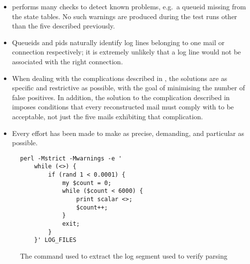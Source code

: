 \begin{itemize}

    \item \parsername{} performs many checks to detect known problems,
        e.g.\ a queueid missing from the state tables.  No such warnings
        are produced during the test runs other than the five described
        previously.

    \item Queueids and \glspl{pid} naturally identify log lines belonging
        to one mail or connection respectively; it is extremely unlikely
        that a log line would not be associated with the right connection.

    \item When dealing with the complications described in
        , the solutions are as specific and
        restrictive as possible, with the goal of minimising the number of
        false positives.  In addition, the solution to the complication
        described in  imposes conditions
        that every reconstructed mail must comply with to be acceptable,
        not just the five mails exhibiting that complication.

    \item Every effort has been made to make \parsername{} as precise,
        demanding, and particular as possible.

\end{itemize}

\renewcommand{\figurename}{Figure}

\begin{figure}[thbp]
    \caption{The command used to extract the log segment used to verify
         parsing}
    \empty{}\label{Command to extract log segment used to verify parsing}

\begin{verbatim}
perl -Mstrict -Mwarnings -e '
    while (<>) {
        if (rand 1 < 0.0001) {
            my $count = 0;
            while ($count < 6000) {
                print scalar <>;
                $count++;
            }
            exit;
        }
    }' LOG_FILES
\end{verbatim}

\end{figure}


